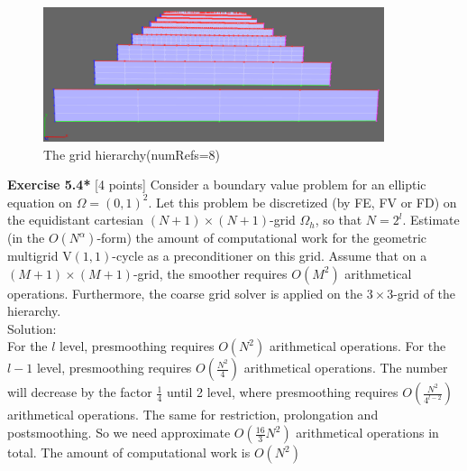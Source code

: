 \documentclass[a4paper]{article}
\begin{document}
\begin{figure}[htbp]
	\centering
	\begin{minipage}[t]{0.7\textwidth}
		\centering		\includegraphics[width=10cm]{grid8.png}
		\caption{The grid hierarchy(numRefs=8)}
	\end{minipage}
\end{figure}

\noindent \textbf{Exercise 5.4*} [4 points] Consider a boundary value problem for an elliptic equation on $\Omega=(0,1)^{2}$. Let this problem be discretized (by FE, FV or FD) on the equidistant cartesian $(N+1) \times(N+1)$-grid $\Omega_{h}$, so that $N=2^{l}$. Estimate (in the $O\left(N^{\alpha}\right)$-form) the amount of computational work for the geometric multigrid $\mathrm{V}(1,1)$-cycle as a preconditioner on this grid. Assume that on a $(M+1) \times(M+1)$-grid, the smoother requires $O\left(M^{2}\right)$ arithmetical operations. Furthermore, the coarse grid solver is applied on the $3 \times 3$-grid of the hierarchy.\\

\noindent Solution:\\
\noindent For the $l$ level, presmoothing requires $O(N^2)$ arithmetical operations. For the $l-1$ level, presmoothing requires $O(\frac{N^2}{4})$ arithmetical operations. The number will decrease by the factor $\frac{1}{4}$ until 2 level, where presmoothing requires $O(\frac{N^2}{4^{l-2}})$ arithmetical operations. The same for restriction, prolongation and postsmoothing. So we need approximate $O(\frac{16}{3}N^2)$ arithmetical operations in total. The amount of computational work is $O(N^2)$\\
\end{document}
